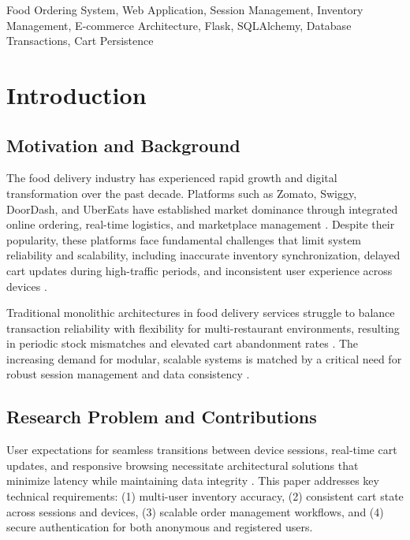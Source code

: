 \documentclass[conference]{IEEEtran}
\begin{document}
\begin{IEEEkeywords}
Food Ordering System, Web Application, Session Management, Inventory Management, E-commerce Architecture, Flask, SQLAlchemy, Database Transactions, Cart Persistence
\end{IEEEkeywords}

\section{Introduction}

\subsection{Motivation and Background}

The food delivery industry has experienced rapid growth and digital transformation over the past decade. Platforms such as Zomato, Swiggy, DoorDash, and UberEats have established market dominance through integrated online ordering, real-time logistics, and marketplace management \cite{b54}. Despite their popularity, these platforms face fundamental challenges that limit system reliability and scalability, including inaccurate inventory synchronization, delayed cart updates during high-traffic periods, and inconsistent user experience across devices \cite{b1, b60, b67}.

Traditional monolithic architectures in food delivery services struggle to balance transaction reliability with flexibility for multi-restaurant environments, resulting in periodic stock mismatches and elevated cart abandonment rates \cite{b1}. The increasing demand for modular, scalable systems is matched by a critical need for robust session management and data consistency \cite{b62, b65, b90}.

\subsection{Research Problem and Contributions}

User expectations for seamless transitions between device sessions, real-time cart updates, and responsive browsing necessitate architectural solutions that minimize latency while maintaining data integrity \cite{b90}. This paper addresses key technical requirements: (1) multi-user inventory accuracy, (2) consistent cart state across sessions and devices, (3) scalable order management workflows, and (4) secure authentication for both anonymous and registered users.
\end{document}
